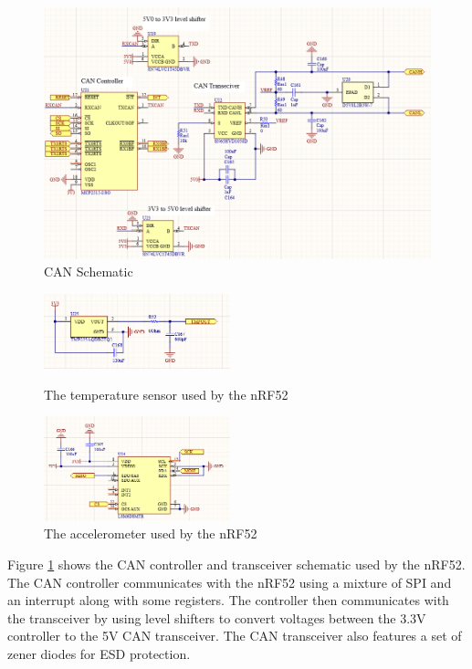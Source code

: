 \documentclass[crop=false]{standalone}
\begin{document}
        \begin{figure}[H]
            \centering
            \includegraphics[width=\textwidth]{M2RBCAN.PNG}
            \caption{CAN Schematic}
            \label{fig:M2RBCAN}
        \end{figure}
            
        \begin{figure}
            \centering
            \includegraphics[width=0.48\textwidth]{M2RBTemp.PNG}
            \caption{The temperature sensor used by the nRF52}
            \label{fig:M2RBTemp}
            \smallskip\par
            \includegraphics[width=0.48\textwidth]{M2RBAccel.PNG}
            \caption{The accelerometer used by the nRF52}
            \label{fig:M2RBAccel}
        \end{figure}
            
        Figure \ref{fig:M2RBCAN} shows the CAN controller and transceiver schematic used by the nRF52. The CAN controller communicates with the nRF52 using a mixture of SPI and an interrupt along with some registers. The controller then communicates with the transceiver by using level shifters to convert voltages between the 3.3V controller to the 5V CAN transceiver. The CAN transceiver also features a set of zener diodes for ESD protection.
            
\end{document}

